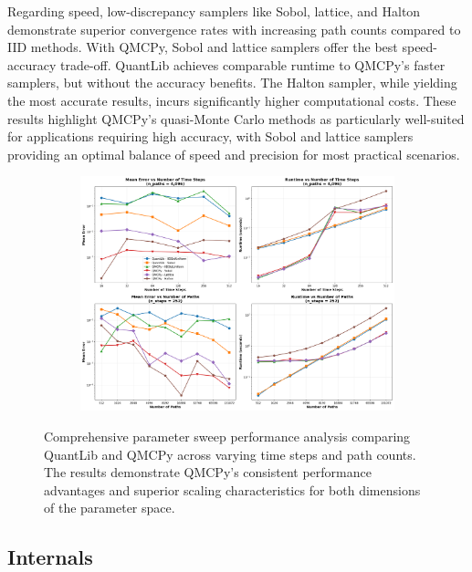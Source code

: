 Regarding speed, low-discrepancy samplers like Sobol, lattice, and Halton
demonstrate superior convergence rates with increasing path counts compared to
IID methods. With QMCPy, Sobol and lattice samplers offer the best
speed-accuracy trade-off. QuantLib achieves comparable runtime to QMCPy's faster
samplers, but without the accuracy benefits. The Halton sampler, while yielding
the most accurate results, incurs significantly higher computational costs.
These results highlight QMCPy's quasi-Monte Carlo methods as particularly
well-suited for applications requiring high accuracy, with Sobol and lattice
samplers providing an optimal balance of speed and precision for most practical
scenarios.

\begin{figure}[H]
    \centering
    \begin{subfigure}{1\textwidth}
        \centering
        \includegraphics[width=\textwidth]{GBM/images/figure_7.png}
        \label{subfig:performance_steps2}
    \end{subfigure}

    \caption{Comprehensive parameter sweep performance analysis comparing QuantLib and QMCPy across varying time steps and path counts. The results demonstrate QMCPy's consistent performance advantages and superior scaling characteristics for both dimensions of the parameter space.}
    \label{fig:gbm_performance2}
\end{figure}

\subsection{Internals}

